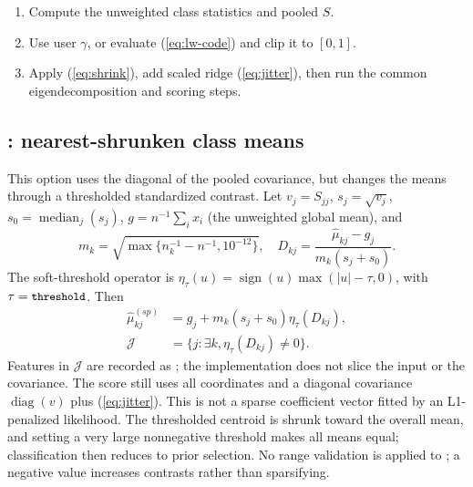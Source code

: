 \documentclass[conference]{IEEEtran}
\begin{document}
\begin{enumerate}
\item Compute the unweighted class statistics and pooled \(S\).
\item Use user \(\gamma\), or evaluate (\ref{eq:lw-code}) and clip it to \([0,1]\).
\item Apply (\ref{eq:shrink}), add scaled ridge (\ref{eq:jitter}), then run the common eigendecomposition and scoring steps.
\end{enumerate}

\subsection{: nearest-shrunken class means}
This option uses the diagonal of the pooled covariance, but changes the means through a thresholded standardized contrast. Let \(v_j=S_{jj}\), \(s_j=\sqrt{v_j}\), \(s_0=\operatorname{median}_j(s_j)\), \(g=n^{-1}\sum_i x_i\) (the unweighted global mean), and
\begin{equation}
m_k=\sqrt{\max\{n_k^{-1}-n^{-1},10^{-12}\}},\quad
D_{kj}=\frac{\hat\mu_{kj}-g_j}{m_k(s_j+s_0)}.
\end{equation}
The soft-threshold operator is \(\eta_\tau(u)=\operatorname{sign}(u)\max(|u|-\tau,0)\), with \(\tau=\texttt{\small threshold}\). Then
\begin{equation}
\begin{aligned}
\hat\mu^{(sp)}_{kj}&=g_j+m_k(s_j+s_0)\eta_\tau(D_{kj}),\\
\mathcal J&=\{j:\exists k,\eta_\tau(D_{kj})\ne0\}.
\end{aligned}
\end{equation}
Features in \(\mathcal J\) are recorded as ; the implementation does not slice the input or the covariance. The score still uses all coordinates and a diagonal covariance \(\operatorname{diag}(v)\) plus (\ref{eq:jitter}). This is not a sparse coefficient vector fitted by an L1-penalized likelihood. The thresholded centroid is shrunk toward the overall mean, and setting a very large nonnegative threshold makes all means equal; classification then reduces to prior selection. No range validation is applied to ; a negative value increases contrasts rather than sparsifying.
\end{document}
